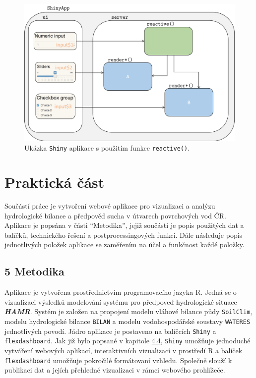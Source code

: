 \documentclass[12pt,]{article}
\begin{document}
\begin{figure}[H]
  \centering
      \includegraphics[width=\textwidth]{fig/shiny}
      \caption{Ukázka \texttt{Shiny} aplikace s použitím funkce \texttt{reactive()}.} 
      \label{fig:ch4.4}
\end{figure}

\newpage

\section*{Praktická část}\label{prakticka-cast}

\qquad Součástí práce je vytvoření webové aplikace pro vizualizaci a
analýzu hydrologické bilance a předpověď sucha v útvarech povrchových
vod ČR. Aplikace je popsána v části \enquote{Metodika}, jejiž součásti
je popis použitých dat a balíčků, technického řešení a
postprocessingových funkci. Dále následuje popis jednotlivých položek
aplikace se zaměřením na účel a funkčnost každé položky.

\subsection{5 Metodika}\label{metodika}

Aplikace je vytvořena prostřednictvím programovacího jazyka R. Jedná se
o vizualizaci výsledků modelování systému pro předpoveď hydrologické
situace \textbf{\emph{HAMR}}. Systém je založen na propojení modelu
vláhové bilance půdy \texttt{SoilClim}, modelu hydrologické bilance
\texttt{BILAN} a modelu vodohospodářské soustavy \texttt{WATERES}
jednotlivých povodí. Jádro aplikace je postaveno na balíčcích
\texttt{Shiny} a \texttt{flexdashboard}. Jak již bylo popsané v kapitole
\protect\hyperlink{webviz}{4.4}, \texttt{Shiny} umožňuje jednoduché
vytváření webových aplikací, interaktivních vizualizací v prostředí R a
balíček \texttt{flexdashboard} umožňuje pokročilé formátovaní vzhledu.
Společně slouží k publikaci dat a jejích přehledné vizualizaci v rámci
webového prohlížeče.
\end{document}
